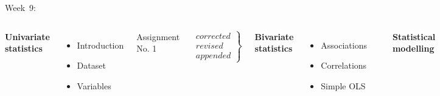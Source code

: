 \documentclass[t]{beamer}
\begin{document}
    \begin{frame}[t]{Week~9: }
    
	    \begin{columns}[T]
	    \textbf{Univariate\\statistics}
    
	    \vspace{.55em}
	    \begin{itemize}
	        \item Introduction
	        \item Dataset
	        \item Variables
	    \end{itemize}

	    Assignment No. 1
    
	    $$
	    \left.
	        \begin{array}{rrr}
	            corrected \\
	            revised\\
	            appended
	        \end{array}
	    \right \}
	    $$
    
	    \textbf{Bivariate\\statistics}
    
	    \begin{itemize}
	        \item Associations
	        \item Correlations
	        \item Simple OLS
	    \end{itemize}
	    \\[.5em]
    
    
	    \textbf{Statistical\\modelling}
    
	    \begin{itemize}
	        \item Regressions
	        \item Diagnostics
	        \item Conclusion
	    \end{itemize}
	    Final paper\\[.5em]
	    \end{columns}
    
    \end{frame}
\end{document}

